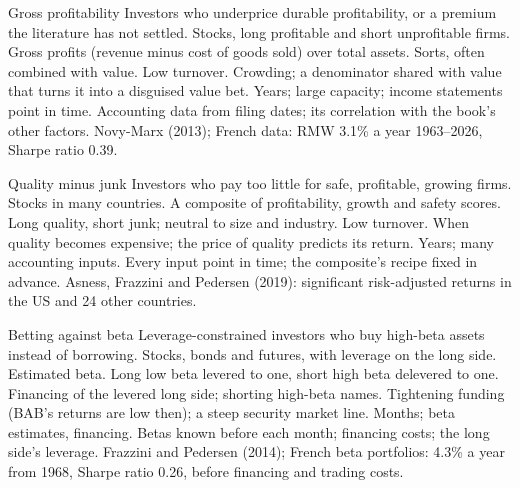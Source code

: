 \begin{strategyfile}{Gross profitability}\label{strat:s1:value-quality-and-low-risk:profitability}
 Investors who underprice durable profitability, or a premium the literature has not settled.
 Stocks, long profitable and short unprofitable firms.
 Gross profits (revenue minus cost of goods sold) over total assets.
 Sorts, often combined with value.
 Low turnover.
 Crowding; a denominator shared with value that turns it into a disguised value bet.
 Years; large capacity; income statements point in time.
 Accounting data from filing dates; its correlation with the book's other factors.
 Novy-Marx (2013); French data: RMW 3.1\% a year 1963--2026, Sharpe ratio 0.39.
\end{strategyfile}

\begin{strategyfile}{Quality minus junk}\label{strat:s1:value-quality-and-low-risk:qmj}
 Investors who pay too little for safe, profitable, growing firms.
 Stocks in many countries.
 A composite of profitability, growth and safety scores.
 Long quality, short junk; neutral to size and industry.
 Low turnover.
 When quality becomes expensive; the price of quality predicts its return.
 Years; many accounting inputs.
 Every input point in time; the composite's recipe fixed in advance.
 Asness, Frazzini and Pedersen (2019): significant risk-adjusted returns in the US and 24 other countries.
\end{strategyfile}

\begin{strategyfile}{Betting against beta}\label{strat:s1:value-quality-and-low-risk:bab}
 Leverage-constrained investors who buy high-beta assets instead of borrowing.
 Stocks, bonds and futures, with leverage on the long side.
 Estimated beta.
 Long low beta levered to one, short high beta delevered to one.
 Financing of the levered long side; shorting high-beta names.
 Tightening funding (BAB's returns are low then); a steep security market line.
 Months; beta estimates, financing.
 Betas known before each month; financing costs; the long side's leverage.
 Frazzini and Pedersen (2014); French beta portfolios: 4.3\% a year from 1968, Sharpe ratio 0.26, before financing and trading costs.
\end{strategyfile}

